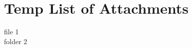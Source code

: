 \documentclass[../main.tex]{subfiles}
\begin{document}
%
    \chapter*{Temp List of Attachments}%
    \label{ch:attachments}%
    \AttachmentListHeader%
    \begin{flushleft}
        file 1 \\
        folder 2 \\
    \end{flushleft}        
\end{document}
